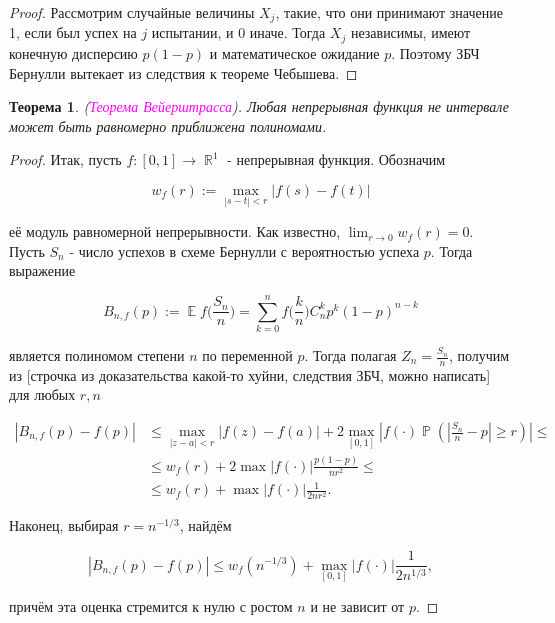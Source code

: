 \documentclass[a4paper,100pt]{article}
\theoremstyle{indented}
\newtheorem{theorem}{Теорема}
\theoremstyle{definition}
\theoremstyle{remark}
\DeclareMathOperator{\ra}{\rightarrow}
\DeclareMathOperator{\RR}{\mathbb{R}}
\DeclareMathOperator{\PP}{\mathbb{P}}
\DeclareMathOperator{\EE}{\mathbb{E}}
\begin{document}
\begin{proof}
  Рассмотрим случайные величины $X_j$, такие, что они принимают значение 1, если был успех на $j$ испытании, и 0 иначе. Тогда $X_j$ независимы, имеют конечную дисперсию $p(1-p)$ и математическое ожидание $p$. Поэтому ЗБЧ Бернулли вытекает из следствия к теореме Чебышева.
\end{proof}

\begin{theorem}
  (\hypertarget{n23}{\textcolor{magenta}{\textit{Теорема Вейерштрасса}}}). Любая непрерывная функция не интервале может быть равномерно приближена полиномами.
\end{theorem}

\begin{proof}
  Итак, пусть $f: [0, 1] \ra \RR^1$ - непрерывная функция. Обозначим

  \[
    w_f(r) := \max_{|s-t|<r} |f(s) - f(t)| 
  \]

  её модуль равномерной непрерывности. Как известно, $\lim_{r \ra 0} w_f(r) = 0$. Пусть $S_n$ - число успехов в схеме Бернулли с вероятностью успеха $p$. Тогда выражение 

  \[
    B_{n, f}(p) := \EE f \biggl(\frac{S_n}{n} \biggr) = \sum_{k=0}^n f \biggl( \frac{k}{n} \biggr) C_n^k p^k (1-p)^{n-k}
  \]

  является полиномом степени $n$ по переменной $p$. Тогда полагая $Z_n = \frac{S_n}{n}$, получим из [строчка из доказательства какой-то хуйни, следствия ЗБЧ, можно написать] для любых $r, n$ 

  \begin{equation*}
    \begin{aligned}
      |B_{n, f}(p)-f(p)| & \leq \max_{|z-a|<r}|f(z)-f(a)|+2\max_{[0, 1]}|f(\cdot) \PP(|\frac{S_n}{n}-p|\geq r)| \leq \\
      & \leq w_f(r)+ 2\max |f(\cdot)| \frac{p(1-p)}{nr^2} \leq \\
      & \leq w_f(r)+\max |f(\cdot)| \frac{1}{2nr^2}. 
    \end{aligned}
  \end{equation*}

  Наконец, выбирая $r=n^{-1/3}$, найдём

  \[
    |B_{n, f}(p)-f(p)|\leq w_f(n^{-1/3})+\max_{[0, 1]}|f(\cdot)| \frac{1}{2n^{1/3}}, 
  \]

  причём эта оценка стремится к нулю с ростом $n$ и не зависит от $p$. 

\end{proof}
\end{document}
